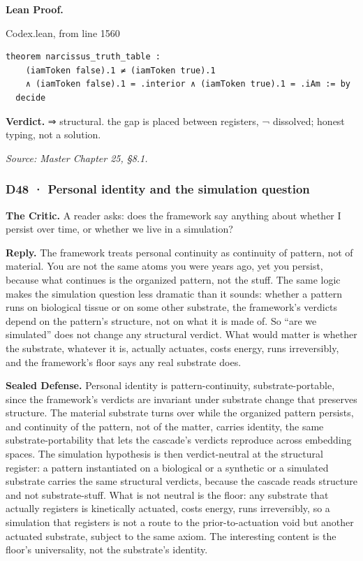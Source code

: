 \documentclass[10pt,twocolumn]{article}
\begin{document}
\textbf{Lean Proof.}

\begin{leanexcerpt}{Codex.lean, from line 1560}
\begin{lstlisting}[style=leanx,firstnumber=1560]
theorem narcissus_truth_table :
    (iamToken false).1 ≠ (iamToken true).1
    ∧ (iamToken false).1 = .interior ∧ (iamToken true).1 = .iAm := by
  decide
\end{lstlisting}
\end{leanexcerpt}

\textbf{Verdict.} ⇒ structural. the gap is placed between registers, ¬
dissolved; honest typing, not a solution.

\emph{Source: Master Chapter 25, §8.1.}

\hypertarget{d48-personal-identity-and-the-simulation-question}{%
\subsubsection{D48 · Personal identity and the simulation
question}\label{d48-personal-identity-and-the-simulation-question}}

\textbf{The Critic.} A reader asks: does the framework say anything
about whether I persist over time, or whether we live in a simulation?

\textbf{Reply.} The framework treats personal continuity as continuity
of pattern, not of material. You are not the same atoms you were years
ago, yet you persist, because what continues is the organized pattern,
not the stuff. The same logic makes the simulation question less
dramatic than it sounds: whether a pattern runs on biological tissue or
on some other substrate, the framework's verdicts depend on the
pattern's structure, not on what it is made of. So ``are we simulated''
does not change any structural verdict. What would matter is whether the
substrate, whatever it is, actually actuates, costs energy, runs
irreversibly, and the framework's floor says any real substrate does.

\textbf{Sealed Defense.} Personal identity is pattern-continuity,
substrate-portable, since the framework's verdicts are invariant under
substrate change that preserves structure. The material substrate turns
over while the organized pattern persists, and continuity of the
pattern, not of the matter, carries identity, the same
substrate-portability that lets the cascade's verdicts reproduce across
embedding spaces. The simulation hypothesis is then verdict-neutral at
the structural register: a pattern instantiated on a biological or a
synthetic or a simulated substrate carries the same structural verdicts,
because the cascade reads structure and not substrate-stuff. What is not
neutral is the floor: any substrate that actually registers is
kinetically actuated, costs energy, runs irreversibly, so a simulation
that registers is not a route to the prior-to-actuation void but another
actuated substrate, subject to the same axiom. The interesting content
is the floor's universality, not the substrate's identity.
\end{document}
